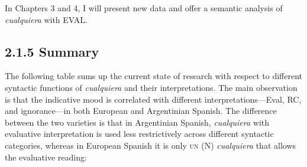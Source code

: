 In Chapters 3 and 4, I will present new data and offer a semantic analysis of \textit{cualquiera} with EVAL.

\subsection{\textbf{2.1.5} \textbf{Summary} }

The following table sums up the current state of research with respect to different syntactic functions of \textit{cualquiera} and their interpretations. The main observation is that the indicative mood is correlated with different interpretations—Eval, RC, and ignorance—in both European and Argentinian Spanish. The difference between the two varieties is that in Argentinian Spanish, \textit{cualquiera} with evaluative interpretation is used less restrictively across different syntactic categories, whereas in European Spanish it is only \textsc{un} (N) \textit{cualquiera} that allows the evaluative reading:


